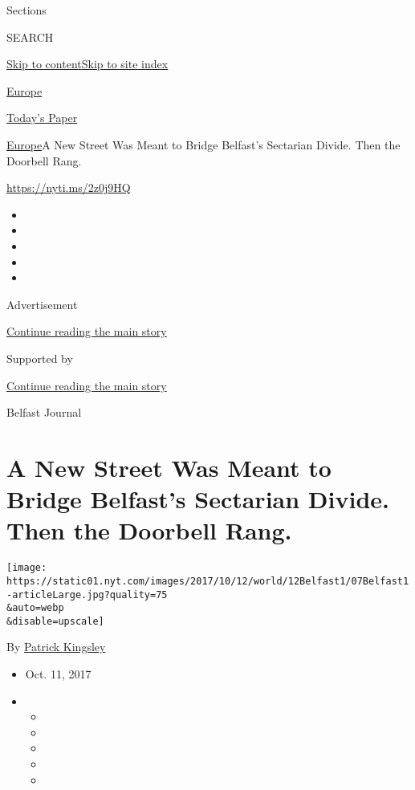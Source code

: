 Sections

SEARCH

\protect\hyperlink{site-content}{Skip to
content}\protect\hyperlink{site-index}{Skip to site index}

\href{https://www.nytimes.com/section/world/europe}{Europe}

\href{https://myaccount.nytimes.com/auth/login?response_type=cookie\&client_id=vi}{}

\href{https://www.nytimes.com/section/todayspaper}{Today's Paper}

\href{/section/world/europe}{Europe}\textbar{}A New Street Was Meant to
Bridge Belfast's Sectarian Divide. Then the Doorbell Rang.

\url{https://nyti.ms/2z0j9HQ}

\begin{itemize}
\item
\item
\item
\item
\item
\end{itemize}

Advertisement

\protect\hyperlink{after-top}{Continue reading the main story}

Supported by

\protect\hyperlink{after-sponsor}{Continue reading the main story}

Belfast Journal

\hypertarget{a-new-street-was-meant-to-bridge-belfasts-sectarian-divide-then-the-doorbell-rang}{%
\section{A New Street Was Meant to Bridge Belfast's Sectarian Divide.
Then the Doorbell
Rang.}\label{a-new-street-was-meant-to-bridge-belfasts-sectarian-divide-then-the-doorbell-rang}}

\texttt{[image: https://static01.nyt.com/images/2017/10/12/world/12Belfast1/07Belfast1-articleLarge.jpg?quality=75\\\&auto=webp\\\&disable=upscale]}

By \href{https://www.nytimes.com/by/patrick-kingsley}{Patrick Kingsley}

\begin{itemize}
\item
  Oct. 11, 2017
\item
  \begin{itemize}
  \item
  \item
  \item
  \item
  \item
  \end{itemize}
\end{itemize}

